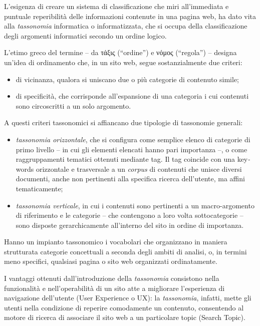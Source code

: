 \documentclass[
  b5paper,
  twoside,
  11pt,
  chapterprefix=false,
  bibliography=totocnumbered,
  listof=flat]{scrbook}
\begin{document}
L'esigenza di creare un sistema di classificazione che miri
all'immediata e puntuale reperibilità delle informazioni contenute in
una pagina web, ha dato vita alla \emph{tassonomia} informatica o
informatizzata, che si occupa della classificazione degli argomenti
informatici secondo un ordine logico.

L'etimo greco del termine -- da τάξις (\enquote{ordine}) e νόμος (\enquote{regola}) --
designa un'idea di ordinamento che, in un sito web, segue
sostanzialmente due criteri:

\begin{itemize}
\item
  di vicinanza, qualora si uniscano due o più categorie di contenuto
  simile;
\item
  di specificità, che corrisponde all'espansione di una categoria i
  cui contenuti sono circoscritti a un solo argomento.
\end{itemize}

A questi criteri tassonomici si affiancano due tipologie di tassonomie
generali:

\begin{itemize}
\item
  \emph{tassonomia orizzontale}, che si configura come semplice elenco di
  categorie di primo livello -- in cui gli elementi elencati hanno
  pari importanza --, o come raggruppamenti tematici ottenuti mediante
  tag. Il tag coincide con una key\emph{-}words orizzontale e trasversale a
  un \emph{corpus} di contenuti che unisce diversi documenti, anche non
  pertinenti alla specifica ricerca dell'utente, ma affini
  tematicamente;
\item
  \emph{tassonomia verticale}, in cui i contenuti sono pertinenti a un
  macro-argomento di riferimento e le categorie -- che contengono a
  loro volta sottocategorie -- sono disposte gerarchicamente
  all'interno del sito in ordine di importanza.
\end{itemize}

Hanno un impianto tassonomico i vocabolari che organizzano in maniera
strutturata categorie concettuali a seconda degli ambiti di analisi, o,
in termini meno specifici, qualsiasi pagina o sito web organizzati
ordinatamente.

I vantaggi ottenuti dall'introduzione della \emph{tassonomia} consistono
nella funzionalità e nell'operabilità di un sito atte a migliorare
l'esperienza di navigazione dell'utente (User Experience o UX): la
\emph{tassonomia}, infatti, mette gli utenti nella condizione di reperire
comodamente un contenuto, consentendo al motore di ricerca di associare
il sito web a un particolare topic (Search Topic).
\end{document}
